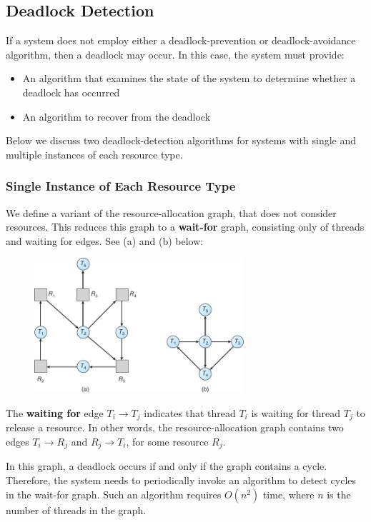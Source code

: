 \documentclass{article}
\begin{document}
\subsection{Deadlock Detection}
If a system does not employ either a deadlock-prevention or
deadlock-avoidance algorithm, then a deadlock may occur. In this case,
the system must provide:
\begin{itemize}
    \item An algorithm that examines the state of the system to
          determine whether a deadlock has occurred
    \item An algorithm to recover from the deadlock
\end{itemize}
Below we discuss two deadlock-detection algorithms for systems with
single and multiple instances of each resource type.
\subsubsection{Single Instance of Each Resource Type}
We define a variant of the resource-allocation graph, that does not
consider resources. This reduces this graph to a \textbf{wait-for}
graph, consisting only of threads and waiting for edges. See (a) and
(b) below:
\begin{figure}[H]
    \centering
    \includegraphics[height = 5cm]{figures/wait_for_graph.pdf}
\end{figure}
The \textbf{waiting for} edge \(T_i \to T_j\)
indicates that thread \(T_i\) is waiting for thread \(T_j\) to release
a resource. In other words, the resource-allocation graph contains two
edges \(T_i \to R_j\) and \(R_j \to T_i\), for some resource \(R_j\).

In this graph, a deadlock occurs if and only if the graph contains a
cycle. Therefore, the system needs to periodically invoke an algorithm
to detect cycles in the wait-for graph. Such an algorithm requires
\(O\left( n^2 \right)\) time, where \(n\) is the number of threads in
the graph.
\end{document}
